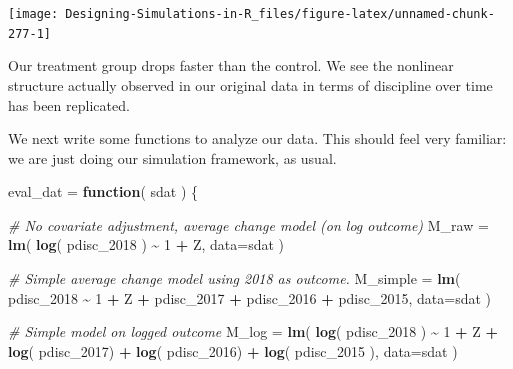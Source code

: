 \documentclass[
]{book}
\newenvironment{Shaded}{\begin{snugshade}}{\end{snugshade}}
\newcommand{\AttributeTok}[1]{\textcolor[rgb]{0.13,0.29,0.53}{#1}}
\newcommand{\CommentTok}[1]{\textcolor[rgb]{0.56,0.35,0.01}{\textit{#1}}}
\newcommand{\ControlFlowTok}[1]{\textcolor[rgb]{0.13,0.29,0.53}{\textbf{#1}}}
\newcommand{\DecValTok}[1]{\textcolor[rgb]{0.00,0.00,0.81}{#1}}
\newcommand{\FunctionTok}[1]{\textcolor[rgb]{0.13,0.29,0.53}{\textbf{#1}}}
\newcommand{\NormalTok}[1]{#1}
\newcommand{\OtherTok}[1]{\textcolor[rgb]{0.56,0.35,0.01}{#1}}
\newcommand{\SpecialCharTok}[1]{\textcolor[rgb]{0.81,0.36,0.00}{\textbf{#1}}}
\begin{document}
\begin{center}\texttt{[image: Designing-Simulations-in-R\_files/figure-latex/unnamed-chunk-277-1]} \end{center}

Our treatment group drops faster than the control. We see the nonlinear structure actually observed in our original data in terms of discipline over time has been replicated.

We next write some functions to analyze our data.
This should feel very familiar: we are just doing our simulation framework, as usual.

\begin{Shaded}
\begin{Highlighting}[]
\NormalTok{eval\_dat }\OtherTok{=} \ControlFlowTok{function}\NormalTok{( sdat ) \{}
    
    \CommentTok{\# No covariate adjustment, average change model (on log outcome)}
\NormalTok{    M\_raw }\OtherTok{=} \FunctionTok{lm}\NormalTok{( }\FunctionTok{log}\NormalTok{( pdisc\_2018 ) }\SpecialCharTok{\textasciitilde{}} \DecValTok{1} \SpecialCharTok{+}\NormalTok{ Z, }\AttributeTok{data=}\NormalTok{sdat )}

    \CommentTok{\# Simple average change model using 2018 as outcome.}
\NormalTok{    M\_simple }\OtherTok{=} \FunctionTok{lm}\NormalTok{( pdisc\_2018 }\SpecialCharTok{\textasciitilde{}} \DecValTok{1} \SpecialCharTok{+}\NormalTok{ Z }\SpecialCharTok{+}\NormalTok{ pdisc\_2017 }\SpecialCharTok{+}\NormalTok{ pdisc\_2016 }\SpecialCharTok{+}\NormalTok{ pdisc\_2015,}
                   \AttributeTok{data=}\NormalTok{sdat )}

    \CommentTok{\# Simple model on logged outcome}
\NormalTok{    M\_log }\OtherTok{=} \FunctionTok{lm}\NormalTok{( }\FunctionTok{log}\NormalTok{( pdisc\_2018 ) }\SpecialCharTok{\textasciitilde{}} \DecValTok{1} \SpecialCharTok{+}\NormalTok{ Z }\SpecialCharTok{+} \FunctionTok{log}\NormalTok{( pdisc\_2017) }\SpecialCharTok{+} \FunctionTok{log}\NormalTok{( pdisc\_2016) }\SpecialCharTok{+} \FunctionTok{log}\NormalTok{( pdisc\_2015 ),}
                \AttributeTok{data=}\NormalTok{sdat )}
    

\end{Highlighting}
\end{Shaded}
\end{document}
